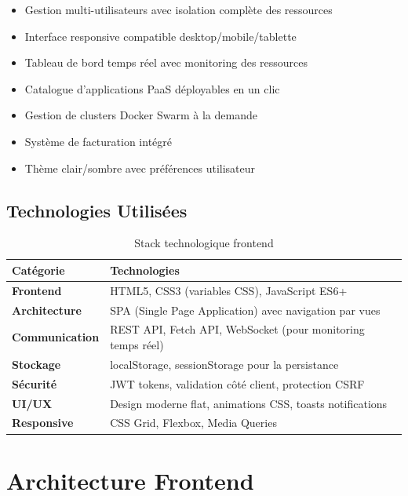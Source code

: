 \documentclass[12pt,a4paper]{article}
\begin{document}
\begin{successbox}
\begin{itemize}
    \item Gestion multi-utilisateurs avec isolation complète des ressources
    \item Interface responsive compatible desktop/mobile/tablette
    \item Tableau de bord temps réel avec monitoring des ressources
    \item Catalogue d'applications PaaS déployables en un clic
    \item Gestion de clusters Docker Swarm à la demande
    \item Système de facturation intégré
    \item Thème clair/sombre avec préférences utilisateur
\end{itemize}
\end{successbox}

\subsection{Technologies Utilisées}

\begin{table}[H]
\centering
\begin{tabular}{>{\bfseries}l p{10cm}}
\toprule
\color{primaryblue}Catégorie & \color{primaryblue}Technologies \\
\midrule
Frontend & HTML5, CSS3 (variables CSS), JavaScript ES6+ \\
Architecture & SPA (Single Page Application) avec navigation par vues \\
Communication & REST API, Fetch API, WebSocket (pour monitoring temps réel) \\
Stockage & localStorage, sessionStorage pour la persistance \\
Sécurité & JWT tokens, validation côté client, protection CSRF \\
UI/UX & Design moderne flat, animations CSS, toasts notifications \\
Responsive & CSS Grid, Flexbox, Media Queries \\
\bottomrule
\end{tabular}
\caption{Stack technologique frontend}
\end{table}

\section{Architecture Frontend}
\end{document}
